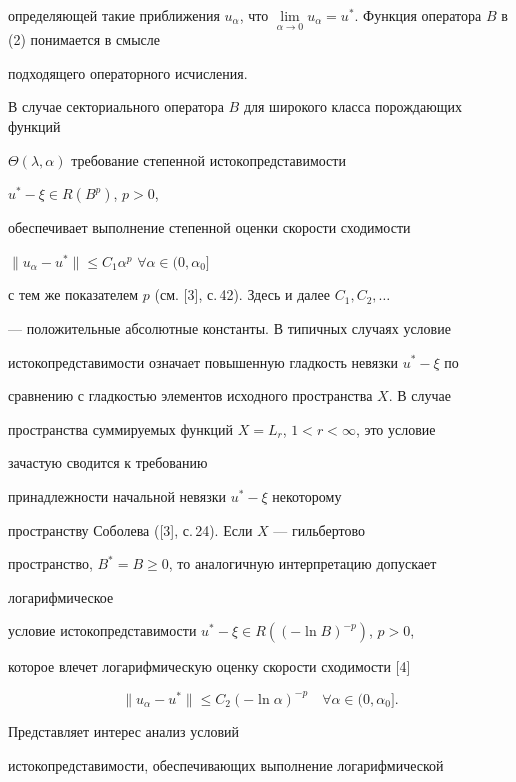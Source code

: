 определяющей такие приближения $u_\alpha$, что $\lim\limits_{\alpha\to 0}


u_{\alpha} = u^*$. Функция оператора $B$ в (2) понимается в смысле


подходящего операторного исчисления.


В случае секториального оператора $B$ для широкого класса порождающих функций


$\Theta(\lambda, \alpha)$ требование степенной истокопредставимости


$u^* - \xi \in R(B^p)$, $p>0$, 


обеспечивает выполнение степенной оценки скорости сходимости


$\|u_{\alpha}-u^*\|\le C_1{\alpha}^p$ \; $\forall\alpha\in(0, \alpha_0]$


с тем же показателем $p$ (см. [3], с.\,42). Здесь и далее $C_1, C_2,\dotsc$


--- положительные абсолютные константы. В типичных случаях условие 


истокопредставимости означает повышенную гладкость невязки $u^* - \xi$ по


сравнению с гладкостью элементов исходного пространства $X$. В случае 


пространства суммируемых функций $X=L_r$, $1<r<\infty$, это условие


зачастую сводится к требованию


принадлежности начальной невязки $u^* - \xi$ некоторому


пространству Соболева ([3], с.\,24). Если $X$ --- гильбертово


пространство, $B^*=B\geq0$, то аналогичную интерпретацию допускает 


логарифмическое


условие истокопредставимости $u^* - \xi \in R((-\ln B)^{-p})$, $p>0$,


которое влечет логарифмическую оценку скорости сходимости [4]


\begin{equation}


\| u_{\alpha} - u^* \| \leq C_2 (- \ln \alpha)^{-p}


\quad\forall\alpha\in(0,\alpha_0].


\end{equation}


Представляет интерес анализ условий


истокопредставимости, обеспечивающих выполнение логарифмической


